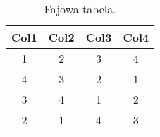 \begin{table}[htbp]
\centering
\begin{tabular}{||c c c c||}
 \hline
 Col1 & Col2 & Col3 & Col4 \\ [0.5ex] 
 \hline\hline
 1 & 2 & 3 & 4   \\
 \hline
 4 & 3 & 2 & 1  \\
 \hline
 3 & 4 & 1 & 2 \\
 \hline
 2 & 1 & 4 & 3 \\
 \hline
\end{tabular}
\label{tab:random_numbers}
\caption{Fajowa tabela.}
\end{table}
